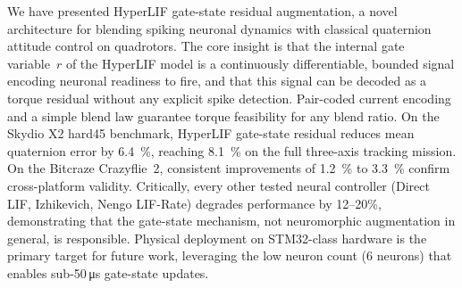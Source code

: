 \documentclass[conference]{IEEEtran}
\begin{document}
We have presented HyperLIF gate-state residual augmentation, a novel
architecture for blending spiking neuronal dynamics with classical quaternion
attitude control on quadrotors.
The core insight is that the internal gate variable~$r$ of the HyperLIF model
is a continuously differentiable, bounded signal encoding neuronal readiness to
fire, and that this signal can be decoded as a torque residual without any
explicit spike detection.
Pair-coded current encoding and a simple blend law guarantee torque feasibility
for any blend ratio.
On the Skydio X2 hard45 benchmark, HyperLIF gate-state residual reduces mean
quaternion error by \SI{6.4}{\percent}, reaching \SI{8.1}{\percent} on the
full three-axis tracking mission.
On the Bitcraze Crazyflie~2, consistent improvements of \SI{1.2}{\percent}
to \SI{3.3}{\percent} confirm cross-platform validity.
Critically, every other tested neural controller (Direct LIF, Izhikevich,
Nengo LIF-Rate) degrades performance by 12--20\%, demonstrating that the
gate-state mechanism, not neuromorphic augmentation in general, is responsible.
Physical deployment on STM32-class hardware is the primary target for future
work, leveraging the low neuron count (6 neurons) that enables sub-50\,\si{\micro\second}
gate-state updates.




\end{document}
